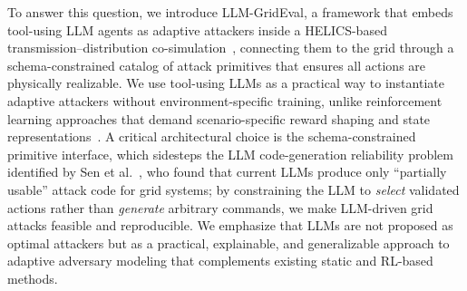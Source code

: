 To answer this question, we introduce LLM-GridEval, a framework that embeds tool-using LLM agents as adaptive attackers inside a HELICS-based transmission--distribution co-simulation~\cite{hardy2024helics}, connecting them to the grid through a schema-constrained catalog of attack primitives that ensures all actions are physically realizable.
We use tool-using LLMs as a practical way to instantiate adaptive attackers without environment-specific training, unlike reinforcement learning approaches that demand scenario-specific reward shaping and state representations~\cite{sahani2023mlids}.
A critical architectural choice is the schema-constrained primitive interface, which sidesteps the LLM code-generation reliability problem identified by Sen et al.~\cite{sen2024aiattacker}, who found that current LLMs produce only ``partially usable'' attack code for grid systems; by constraining the LLM to \emph{select} validated actions rather than \emph{generate} arbitrary commands, we make LLM-driven grid attacks feasible and reproducible.
We emphasize that LLMs are not proposed as optimal attackers but as a practical, explainable, and generalizable approach to adaptive adversary modeling that complements existing static and RL-based methods.

